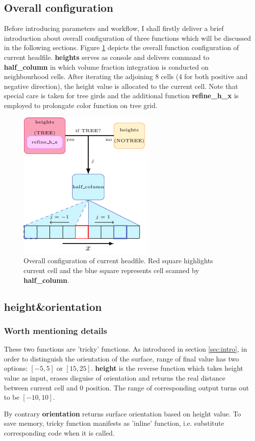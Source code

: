 \documentclass[a4paper]{article}
\newcommand{\func}[1]{\textbf{\textcolor{function}{#1}}}
\begin{document}
\subsection{Overall configuration}\label{sec:config}
Before introducing parameters and workflow, I shall firstly deliver a brief introduction about overall configuration of three functions which will be discussed in the following sections. Figure \ref{fig:funcconfig} depicts the overall function configuration of current headfile. \func{heights} serves as console and delivers command to \func{half\_column} in which volume fraction integration is conducted on neighbourhood cells. After iterating the adjoining $8$ cells (4 for both positive and negative direction), the height value is allocated to the current cell. Note that special care is taken for tree girds and the additional function \func{refine\_h\_x} is employed to prolongate color function on tree grid.  
\begin{figure}
    \centering
    \includegraphics[width=0.6\textwidth]{image/heights.pdf}
    \caption{Overall configuration of current headfile. Red square highlights current cell and the blue square represents cell scanned by \func{half\_column}.}
    \label{fig:funcconfig}
\end{figure}
\subsection{\func{height}\&\func{orientation}}
\subsubsection{Worth mentioning details}
These two functions are 'tricky' functions. As introduced in section \ref{sec:intro}, in order to distinguish the orientation of the surface, range of final value has two options: $[-5,5]$ or $[15,25]$. \func{height} is the reverse function which takes height value as input, erases disguise of orientation and returns the real distance between current cell and 0 position. The range of corresponding output turns out to be $[-10,10]$.\par
By contrary \func{orientation} returns surface orientation based on height value. To save memory, tricky function manifests as 'inline' function, i.e. substitute corresponding code when it is called.
\end{document}
